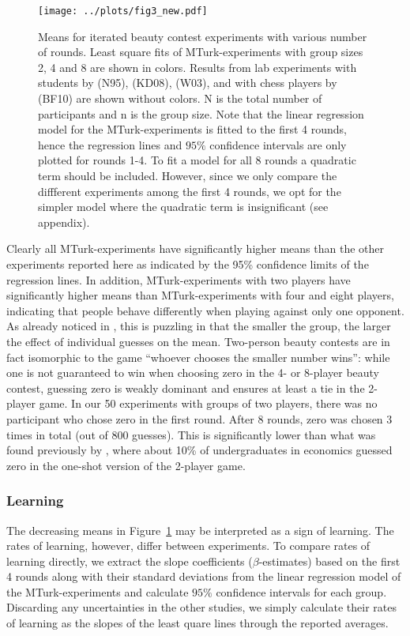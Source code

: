 \documentclass[12pt,review]{elsarticle}
\begin{document}
\begin{figure}
\texttt{[image: ../plots/fig3\_new.pdf]}
\caption{Means for iterated beauty contest experiments with various number of rounds. Least square fits of MTurk-experiments with group sizes 2, 4 and 8 are shown in colors. Results from lab experiments with students by \citet{Nagel95} (N95), \citet{Kamm2008unter} (KD08), \citet{weber2003learning} (W03), and with chess players by \citet{buhren2010chess} (BF10) are shown without colors. N is the total number of participants and n is the group size. Note that the linear regression model for the MTurk-experiments is fitted to the first 4 rounds, hence the regression lines and $95\%$ confidence intervals are only plotted for rounds 1-4. To fit a model for all 8 rounds a quadratic term should be included. However, since we only compare the diffferent experiments among the first 4 rounds, we opt for the simpler model where the quadratic term is insignificant (see appendix).}
\label{fig:means}
\end{figure}

Clearly all MTurk-experiments have significantly higher means than the other experiments reported here as indicated by the 95\% confidence limits of the regression lines. In addition, MTurk-experiments with two players have significantly higher means than MTurk-experiments with four and eight players, indicating that people behave differently when playing against only one opponent. As already noticed in \citet{HoCamererWeigelt98}, this is puzzling in that the smaller the group, the larger the effect of individual guesses on the mean. Two-person beauty contests are in fact isomorphic to the game \textquotedblleft whoever chooses the smaller number wins\textquotedblright : while one is not guaranteed to win when choosing zero in the 4- or 8-player beauty contest, guessing zero is weakly dominant and ensures at least a tie in the 2-player game. In our 50 experiments with groups of two players, there was no participant who chose zero in the first round. After 8 rounds, zero was chosen 3 times in total (out of 800 guesses). This is significantly lower than what was found previously by \citet{NagelGrosskopf2008}, where about 10\% of undergraduates in economics guessed zero in the one-shot version of the 2-player game.

\subsubsection{Learning}
\noindent
The decreasing means in Figure~\ref{fig:means} may be interpreted as a sign of learning. The rates of learning, however, differ between experiments. To compare rates of learning directly, we extract the slope coefficients ($\beta$-estimates) based on the first 4 rounds along with their standard deviations from the linear regression model of the MTurk-experiments and calculate $95\%$ confidence intervals for each group. Discarding any uncertainties in the other studies, we simply calculate their rates of learning as the slopes of the least quare lines through the reported averages. 
\end{document}
